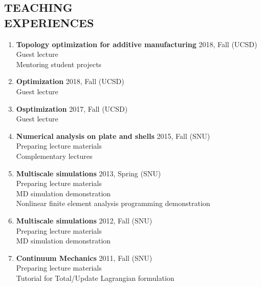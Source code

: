 \documentclass[margin, 10pt]{res} %
\begin{document}
\begin{resume}
\section{TEACHING \\EXPERIENCES}
\begin{enumerate}
    \item \textbf{Topology optimization for additive manufacturing} \hfill 2018, Fall (UCSD) \\
    Guest lecture \\
    Mentoring student projects \\

    \item \textbf{Optimization} \hfill 2018, Fall (UCSD) \\
    Guest lecture \\

    \item \textbf{Osptimization} \hfill 2017, Fall (UCSD) \\
    Guest lecture \\
    
    \item \textbf{Numerical analysis on plate and shells} \hfill 2015, Fall (SNU) \\
    Preparing lecture materials \\
    Complementary lectures \\
    
    \item \textbf{Multiscale simulations } \hfill 2013, Spring (SNU)\\
    Preparing lecture materials \\
	MD simulation demonstration\\
	Nonlinear finite element analysis programming demonstration\\

    \item \textbf{Multiscale simulations } \hfill 2012, Fall (SNU)\\
    Preparing lecture materials \\
	MD simulation demonstration \\
    
    \item \textbf{Continuum Mechanics } \hfill 2011, Fall (SNU)\\
	Preparing lecture materials \\
	Tutorial for Total/Update Lagrangian formulation 


\end{enumerate}
\end{resume}
\end{document}
